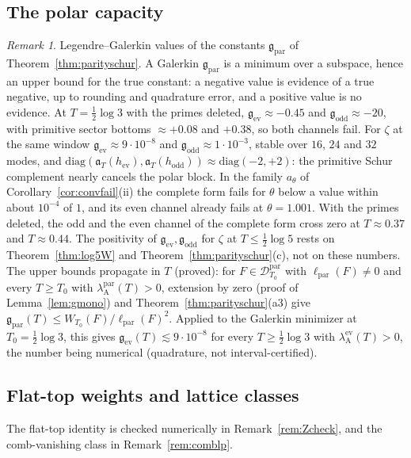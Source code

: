 \documentclass[11pt]{amsart}
\theoremstyle{definition}
\theoremstyle{remark}
\newtheorem{remark}[theorem]{Remark}
\begin{document}
\subsection{The polar capacity}
\begin{remark}\label{rem:polarcapdiag}
Legendre--Galerkin values of the constants $\mathfrak g_{\mathrm{par}}$ of Theorem~\ref{thm:parityschur}. A Galerkin
$\mathfrak g_{\mathrm{par}}$ is a minimum over a subspace, hence an upper bound for the true constant: a negative value is
evidence of a true negative, up to rounding and quadrature error, and a positive value is no evidence. At
$T=\frac12\log3$ with the primes deleted, $\mathfrak g_{\mathrm{ev}}\approx-0.45$ and $\mathfrak g_{\mathrm{odd}}\approx-20$, with primitive
sector bottoms $\approx+0.08$ and $+0.38$, so both channels fail. For $\zeta$ at the same window
$\mathfrak g_{\mathrm{ev}}\approx9\cdot10^{-8}$ and $\mathfrak g_{\mathrm{odd}}\approx1\cdot10^{-3}$, stable over $16$, $24$ and $32$ modes, and
$\mathrm{diag}(\mathfrak a_T(h_{\mathrm{ev}}),\mathfrak a_T(h_{\mathrm{odd}}))\approx\mathrm{diag}(-2,+2)$: the primitive Schur complement nearly
cancels the polar block. In the family $a_\theta$ of Corollary~\ref{cor:convfail}(ii) the complete form fails for $\theta$
below a value within about $10^{-4}$ of $1$, and its even channel already fails at $\theta=1.001$. With the primes
deleted, the odd and the even channel of the complete form cross zero at $T\approx0.37$ and $T\approx0.44$. The positivity
of $\mathfrak g_{\mathrm{ev}},\mathfrak g_{\mathrm{odd}}$ for $\zeta$ at $T\le\frac12\log5$ rests on Theorem~\ref{thm:log5W} and
Theorem~\ref{thm:parityschur}(c), not on these numbers. The upper bounds propagate in $T$ (proved): for
$F\in\mathcal D^{\mathrm{par}}_{T_0}$ with $\ell_{\mathrm{par}}(F)\ne0$ and every $T\ge T_0$ with $\lambda^{\mathrm{par}}_{\mathrm A}(T)>0$,
extension by zero (proof of Lemma~\ref{lem:gmono}) and Theorem~\ref{thm:parityschur}(a3) give
$\mathfrak g_{\mathrm{par}}(T)\le W_{T_0}(F)/\ell_{\mathrm{par}}(F)^2$. Applied to the Galerkin minimizer at $T_0=\frac12\log3$, this
gives $\mathfrak g_{\mathrm{ev}}(T)\lesssim9\cdot10^{-8}$ for every $T\ge\frac12\log3$ with $\lambda^{\mathrm{ev}}_{\mathrm A}(T)>0$, the
number being numerical (quadrature, not interval-certified).
\end{remark}

\subsection{Flat-top weights and lattice classes}
The flat-top identity is checked numerically in Remark~\ref{rem:Zcheck}, and the comb-vanishing class in Remark~\ref{rem:comblp}.
\end{document}
